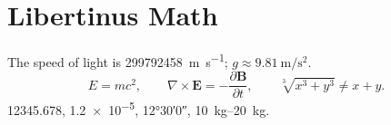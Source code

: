 \documentclass{article}
\begin{document}
\section{Libertinus Math}
The speed of light is \SI{299792458}{\metre\per\second}; $g \approx \SI{9.81}{\metre\per\second\squared}$.
\[ E = mc^2, \qquad \nabla\times\mathbf{E} = -\frac{\partial\mathbf{B}}{\partial t}, \qquad
   \sqrt[3]{x^3+y^3} \neq x+y. \]
\num{12345.678}, \num{1.2e-5}, \ang{12;30;0}, \SIrange{10}{20}{\kilo\gram}.
\end{document}
